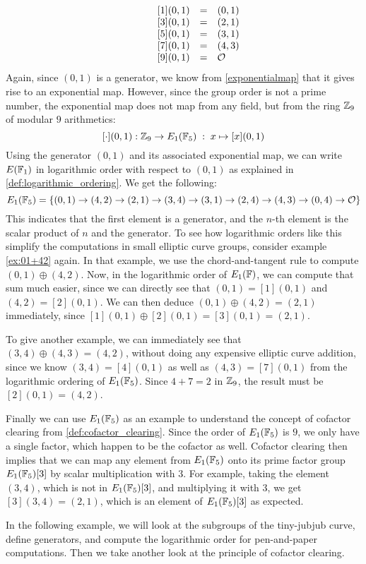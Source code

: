 \begin{example}
$$\begin{array}{lccr}
\begin{array}{lcl}
\end{array} & & &
{}\begin{array}{lcl}
{}[1](0,1) &=& (0, 1) \\
{}[3](0,1) &=& (2, 1) \\
{}[5](0,1) &=& (3, 1) \\
{}[7](0,1) &=& (4, 3) \\
{}[9](0,1) &=& \mathcal{O}
\end{array}
\end{array}
$$
Again, since $(0,1)$ is a generator, we know from \ref{exponentialmap} that it gives rise to an exponential map. However, since the group order is not a prime number, the exponential map does not map from any field, but from the ring $\mathbb{Z}_9$ of modular $9$ arithmetics:
$$
[\cdot](0,1): \mathbb{Z}_9 \to E_1(\mathbb{F}_5)\; : \; x\mapsto [x](0,1) 
$$
Using the generator $(0,1)$ and its associated exponential map, we can write $E(\mathbb{F}_1)$ in logarithmic order with respect to $(0,1)$ as explained in \ref{def:logarithmic_ordering}. We get the following:
$$
E_1(\mathbb{F}_5) = \{(0, 1)\to (4, 2)\to (2, 1)\to (3, 4)\to (3, 1)\to (2, 4)\to (4, 3)\to (0, 4)\to \mathcal{O} \}
$$
This indicates that the first element is a generator, and the $n$-th element is the scalar product of $n$ and the generator. To see how logarithmic orders like this simplify the computations in small elliptic curve groups, consider example \ref{ex:01+42} again. In that example, we use the chord-and-tangent rule to compute $(0,1)\oplus (4,2)$. Now, in the logarithmic order of $E_1(\mathbb{F})$, we can compute that sum much easier, since we can directly see that $(0,1)=[1](0,1)$ and $(4,2)=[2](0,1)$. We can then deduce $(0,1)\oplus (4,2)= (2,1)$ immediately, since $[1](0,1)\oplus [2](0,1)= [3](0,1)=(2,1)$.

To give another example, we can immediately see that $(3,4)\oplus (4,3) = (4,2)$, without doing any expensive elliptic curve addition, since we know $(3,4)= [4](0,1)$ as well as $(4,3)= [7](0,1)$ from the logarithmic ordering of $E_1(\mathbb{F}_5)$. Since $4+7 = 2$ in $\mathbb{Z}_9$, the result must be $[2](0,1)=(4,2)$.

Finally we can use $E_1(\mathbb{F}_5)$ as an example to understand the concept of cofactor clearing from \ref{def:cofactor_clearing}. Since the order of $E_1(\mathbb{F}_5)$ is $9$, we only have a single factor, which happen to be the cofactor as well. Cofactor clearing then implies that we can map any element from $E_1(\mathbb{F}_5)$ onto its prime factor group $E_1(\mathbb{F}_5)[3]$ by scalar multiplication with $3$. For example, taking the element $(3,4)$, which is not in $E_1(\mathbb{F}_5)[3]$, and multiplying it with $3$, we get $[3](3,4)= (2,1)$, which is an element of $E_1(\mathbb{F}_5)[3]$ as expected.
\end{example}
In the following example, we will look at the subgroups of the tiny-jubjub curve, define generators, and compute the logarithmic order for pen-and-paper computations. Then we take another look at the principle of cofactor clearing.

